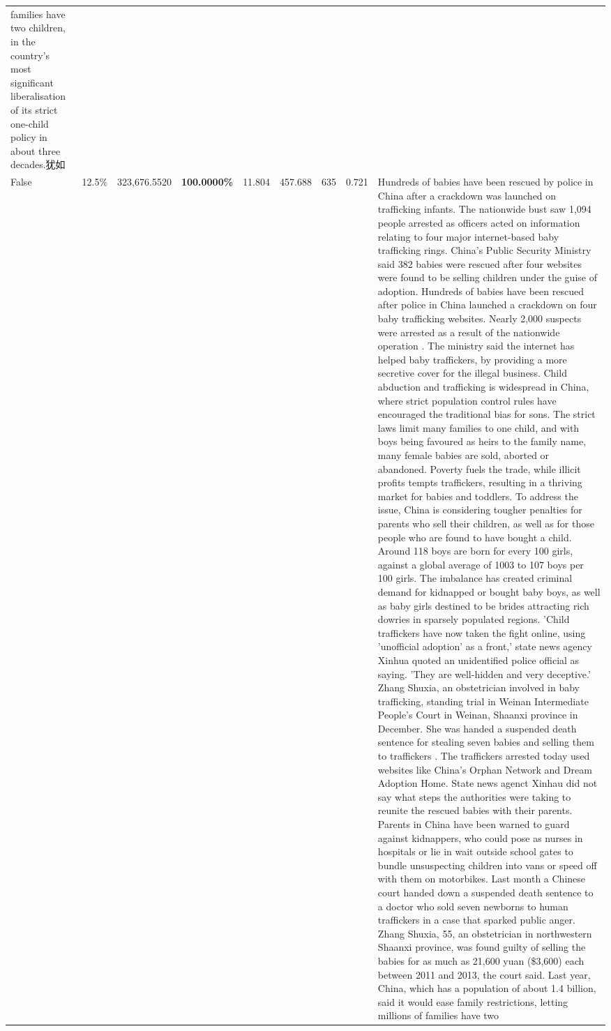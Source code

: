 \begin{table}[H]
\begin{tabular}{lllrlllll}
families have two children, in the country's most significant liberalisation of its strict one-child policy in about three decades.犹如 \\
\cline{1-9}
False & 12.5\% & 323,676.5520 & \bfseries \color{red} 100.0000\% & 11.804 & 457.688 & 635 & 0.721 & Hundreds of babies have been rescued by police in China after a crackdown was launched on trafficking infants. The nationwide bust saw 1,094 people arrested as officers acted on information relating to four major internet-based baby trafficking rings. China's Public Security Ministry said 382 babies were rescued after four websites were found to be selling children under the guise of adoption. Hundreds of babies have been rescued after police in China launched a crackdown on four baby trafficking websites. Nearly 2,000 suspects were arrested as a result of the nationwide operation . The ministry said the internet has helped baby traffickers, by providing a more secretive cover for the illegal business. Child abduction and trafficking is widespread in China, where strict population control rules have encouraged the traditional bias for sons. The strict laws limit many families to one child, and with boys being favoured as heirs to the family name, many female babies are sold, aborted or abandoned. Poverty fuels the trade, while illicit profits tempts traffickers, resulting in a thriving market for babies and toddlers. To address the issue, China is considering tougher penalties for parents who sell their children, as well as for those people who are found to have bought a child. Around 118 boys are born for every 100 girls, against a global average of 1003 to 107 boys per 100 girls. The imbalance has created criminal demand for kidnapped or bought baby boys, as well as baby girls destined to be brides attracting rich dowries in sparsely populated regions. 'Child traffickers have now taken the fight online, using 'unofficial adoption' as a front,' state news agency Xinhua quoted an unidentified police official as saying. 'They are well-hidden and very deceptive.' Zhang Shuxia, an obstetrician involved in baby trafficking, standing trial in Weinan Intermediate People's Court in Weinan, Shaanxi province in December. She was handed a suspended death sentence for stealing seven babies and selling them to traffickers . The traffickers arrested today used websites like China's Orphan Network and Dream Adoption Home. State news agenct Xinhau did not say what steps the authorities were taking to reunite the rescued babies with their parents. Parents in China have been warned to guard against kidnappers, who could pose as nurses in hospitals or lie in wait outside school gates to bundle unsuspecting children into vans or speed off with them on motorbikes. Last month a Chinese court handed down a suspended death sentence to a doctor who sold seven newborns to human traffickers in a case that sparked public anger. Zhang Shuxia, 55, an obstetrician in northwestern Shaanxi province, was found guilty of selling the babies for as much as 21,600 yuan (\$3,600) each between 2011 and 2013, the court said. Last year, China, which has a population of about 1.4 billion, said it would ease family restrictions, letting millions of families have two 
\end{tabular}
\end{table}

